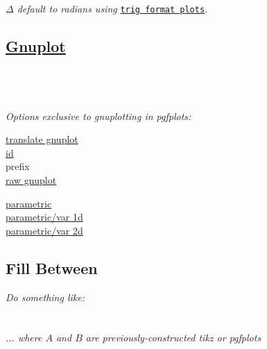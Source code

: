 \textit{$\Delta$ default to radians using }\href{\docurl\#pgfp./pgfplots/trig:format:plots}{\texttt{\color{blue}trig format plots}}.



\subsection*{\href{http://www.gnuplot.info/documentation.html}{Gnuplot}}

\\
\\
\\

\textit{Options exclusive to gnuplotting in pgfplots:}\\
{\color{blue} \begin{minipage}[t]{3.0cm}
\href{\docurl\#pgfp./pgfplots/translate:gnuplot}{translate gnuplot}\\
\href{\docurl\#pgfp./tikz/id}{id}\\
prefix\\
\href{\docurl\#pgfp./tikz/raw:gnuplot}{raw gnuplot}\\
\end{minipage}\begin{minipage}[t]{3.0cm}
\href{\docurl\#pgfp./pgfplots/parametric}{parametric}\\
\href{\docurl\#pgfp./pgfplots/parametric/var:1d}{parametric/var 1d}\\
\href{\docurl\#pgfp./pgfplots/parametric/var:2d}{parametric/var 2d}\\
\end{minipage}}



\subsection*{Fill Between}

\textit{Do something like:}\\
\href{\docurl\#pgfp.fill:between}{}\\
\code{\phantom{xxx}[of=A and B,soft clip=\{domain=3:4\},];}\\
\textit{... where $A$ and $B$ are previously-constructed tikz or pgfplots }



